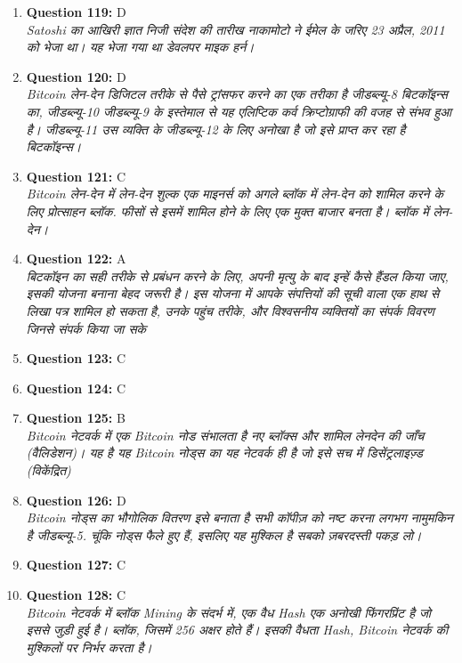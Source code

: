 \documentclass[12pt,a4paper]{article}
\begin{document}
\begin{enumerate}
\item \textbf{Question 119:} D
\\ \textit{Satoshi का आखिरी ज्ञात निजी संदेश की तारीख नाकामोटो ने ईमेल के जरिए 23 अप्रैल, 2011 को भेजा था। यह भेजा गया था डेवलपर माइक हर्न।}

\item \textbf{Question 120:} D
\\ \textit{Bitcoin लेन-देन डिजिटल तरीके से पैसे ट्रांसफर करने का एक तरीका है जीडब्ल्यू-8 बिटकॉइन्स का, जीडब्ल्यू-10 जीडब्ल्यू-9 के इस्तेमाल से यह एलिप्टिक कर्व क्रिप्टोग्राफी की वजह से संभव हुआ है। जीडब्ल्यू-11 उस व्यक्ति के जीडब्ल्यू-12 के लिए अनोखा है जो इसे प्राप्त कर रहा है बिटकॉइन्स।}

\item \textbf{Question 121:} C
\\ \textit{Bitcoin लेन-देन में लेन-देन शुल्क एक माइनर्स को अगले ब्लॉक में लेन-देन को शामिल करने के लिए प्रोत्साहन ब्लॉक. फीसों से इसमें शामिल होने के लिए एक मुक्त बाजार बनता है। ब्लॉक में लेन-देन।}

\item \textbf{Question 122:} A
\\ \textit{बिटकॉइन का सही तरीके से प्रबंधन करने के लिए, अपनी मृत्यु के बाद इन्हें कैसे हैंडल किया जाए, इसकी योजना बनाना बेहद जरूरी है। इस योजना में आपके संपत्तियों की सूची वाला एक हाथ से लिखा पत्र शामिल हो सकता है, उनके पहुंच तरीके, और विश्वसनीय व्यक्तियों का संपर्क विवरण जिनसे संपर्क किया जा सके}

\item \textbf{Question 123:} C

\item \textbf{Question 124:} C

\item \textbf{Question 125:} B
\\ \textit{Bitcoin नेटवर्क में एक Bitcoin नोड संभालता है नए ब्लॉक्स और शामिल लेनदेन की जाँच (वैलिडेशन)। यह है यह Bitcoin नोड्स का यह नेटवर्क ही है जो इसे सच में डिसेंट्रलाइज़्ड (विकेंद्रित)}

\item \textbf{Question 126:} D
\\ \textit{Bitcoin नोड्स का भौगोलिक वितरण इसे बनाता है सभी कॉपीज़ को नष्ट करना लगभग नामुमकिन है जीडब्ल्यू-5. चूंकि नोड्स फैले हुए हैं, इसलिए यह मुश्किल है सबको ज़बरदस्ती पकड़ लो।}

\item \textbf{Question 127:} C

\item \textbf{Question 128:} C
\\ \textit{Bitcoin नेटवर्क में ब्लॉक Mining के संदर्भ में, एक वैध Hash एक अनोखी फिंगरप्रिंट है जो इससे जुड़ी हुई है। ब्लॉक, जिसमें 256 अक्षर होते हैं। इसकी वैधता Hash, Bitcoin नेटवर्क की मुश्किलों पर निर्भर करता है।}


\end{enumerate}
\end{document}

